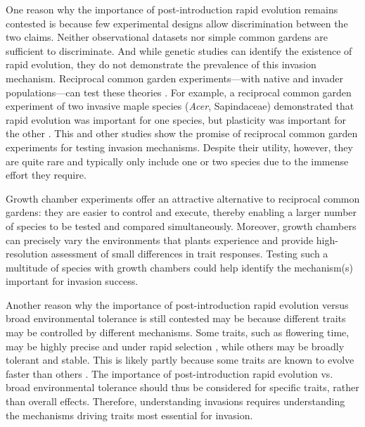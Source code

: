 \documentclass[12pt]{article}\usepackage[]{graphicx}\usepackage[]{color}
\begin{document}
	
	One reason why the importance of post-introduction rapid evolution remains contested is because few experimental designs allow discrimination between the two claims. Neither observational datasets \parencite[e.g.,][]{Wolkovich2013} nor simple common gardens \parencite[i.e., testing individuals from only one part of the range or in only one site,][]{Conner2004,Vitasse2009} are sufficient to discriminate. And while genetic studies can identify the existence of rapid evolution, they do not demonstrate the prevalence of this invasion mechanism. Reciprocal common garden experiments---with native and invader populations---can test these theories \parencite[e.g.,][]{Williams2008}. For example, a reciprocal common garden experiment of two invasive maple species (\textit{Acer}, Sapindaceae) demonstrated that rapid evolution was important for one species, but plasticity was important for the other \parencite{Lamarque2015}.  This and other studies show the promise of reciprocal common garden experiments for testing invasion mechanisms. Despite their utility, however, they are quite rare and typically only include one or two species due to the immense effort they require. 
	
	Growth chamber experiments offer an attractive alternative to reciprocal common gardens: they are easier to control and execute, thereby enabling a larger number of species to be tested and compared simultaneously. Moreover, growth chambers can precisely vary the environments that plants experience and provide high-resolution assessment of small differences in trait responses. Testing such a multitude of species with growth chambers could help identify the mechanism(s) important for invasion success.  
	
	Another reason why the importance of post-introduction rapid evolution versus broad environmental tolerance is still contested may be because different traits may be controlled by different mechanisms. Some traits, such as flowering time, may be highly precise and under rapid selection \parencite{Weber1998}, while others may be broadly tolerant and stable. This is likely partly because some traits are known to evolve faster than others \parencite{Weiss-Lehman2017}. The importance of post-introduction rapid evolution vs. broad environmental tolerance should thus be considered for specific traits, rather than overall effects. Therefore,  understanding invasions requires understanding the mechanisms driving traits most essential for invasion.
	
\end{document}
